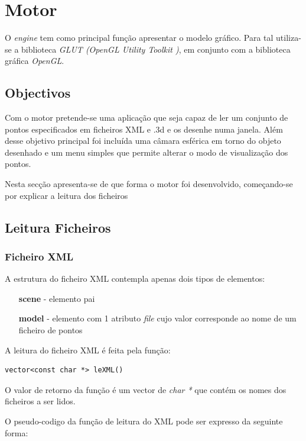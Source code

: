 \chapter{Motor}
\label{cap:p2}

O \textit{engine} tem como principal função apresentar o modelo gráfico. Para
tal utiliza-se a biblioteca \textit{GLUT (OpenGL Utility Toolkit )}, em conjunto com
a biblioteca gráfica \textit{OpenGL}.


\section{Objectivos}

Com o motor pretende-se uma aplicação que seja capaz de ler um conjunto de pontos especificados em ficheiros XML e .3d e os desenhe numa janela. Além desse objetivo principal foi incluída uma câmara esférica em torno do objeto desenhado e um menu simples que permite alterar o modo de visualização dos pontos.

Nesta secção apresenta-se de que forma o motor foi desenvolvido, começando-se por explicar a leitura dos ficheiros

\section{Leitura Ficheiros}

\subsection{Ficheiro XML}

A estrutura do ficheiro XML contempla apenas dois tipos de elementos:

\begin{itemize}
	\item[\textbf{scene}] - elemento pai
	\item[\textbf{model}] - elemento com 1 atributo \textit{file} cujo valor corresponde ao nome de um ficheiro de pontos
\end{itemize}

A leitura do ficheiro XML é feita pela função:

\begin{Verbatim}
vector<const char *> leXML()
\end{Verbatim}

O valor de retorno da função é um vector de \textit{char *} que contém os nomes dos ficheiros a ser lidos.

O pseudo-codigo da função de leitura do XML pode ser expresso da seguinte forma:

